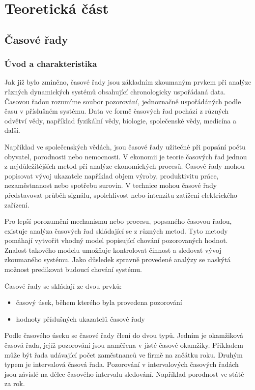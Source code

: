 \documentclass[a4paper,12pt,twoside]{scrreprt}
\begin{document}
\chapter{Teoretická část}

\section{Časové řady}
\subsection{Úvod a charakteristika}

Jak již bylo zmíněno, časové řady jsou základním zkoumaným prvkem při analýze různých dynamických systémů obsahující chronologicky uspořádaná data. Časovou řadou rozumíme soubor pozorování, jednoznačně uspořádáných podle času v příslušném systému. Data ve formě časových řad pochází z různých odvětví vědy, například fyzikální vědy, biologie, společenské vědy, medicína a další.

Například ve společenských vědách, jsou časové řady užitečné při popsání počtu obyvatel, porodnosti nebo nemocnosti. V ekonomii je teorie časových řad jednou z nejdůležitějších metod při analýze ekonomických procesů. Časové řady mohou popisovat vývoj ukazatele například objem výroby, produktivitu práce, nezaměstnanost nebo spotřebu surovin. V technice mohou časové řady představovat průběh signálu, spolehlivost nebo intenzitu zatížení elektrického zařízení. 

Pro lepší porozumění mechanismu nebo procesu, popsaného časovou řadou, \\ existuje analýza časových řad skládající se z různých metod. Tyto metody pomáhají vytvořit vhodný model popisující chování pozorovaných hodnot. Znalost takového modelu umožňuje kontrolovat činnost a sledovat vývoj zkoumaného systému. Jako důsledek spravně provedené analýzy se naskýtá možnost predikovat budoucí chování systému.

Časové řady se skládají ze dvou prvků:
\begin{itemize}
\item časový úsek, během kterého byla provedena pozorování
\item hodnoty příslušných ukazatelů časové řady
\end{itemize}

Podle časového úseku se časové řady člení do dvou typů. Jedním je okamžiková časová řada, jejíž pozorování jsou naměřena v jisté časové okamžiky. Příkladem může být řada udávající počet zaměstnanců ve firmě na začátku roku. Druhým typem je intervalová časová řada. Pozorování v intervalových časových řadách jsou závislé na délce časového intervalu sledování. Například porodnost ve státě za rok. 
\end{document}
